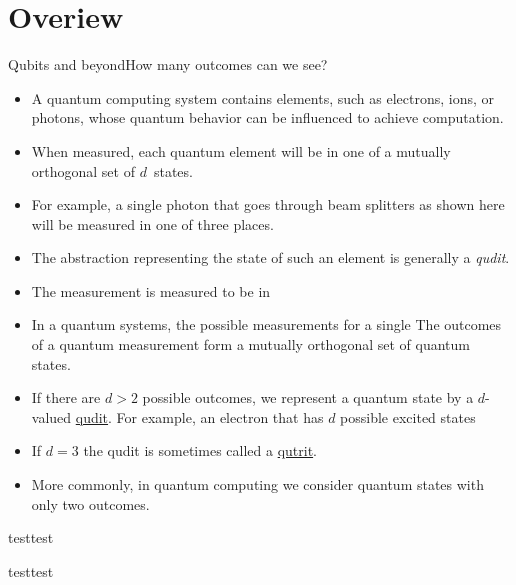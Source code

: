 
\section{Overiew}
\begin{frame}{Qubits and beyond}{How many outcomes can we see?}
\begin{itemize}
    \item A quantum computing system contains elements, such as electrons, ions, or photons, whose quantum behavior can be influenced to achieve computation.
    \item When measured, each quantum element will be in one of a mutually orthogonal set of $d$~states.
    \item For example, a single photon that goes through beam splitters as shown here will be measured in one of three places.
    \item The abstraction representing the state of such an element is generally a \emph{qudit}.
    \item The measurement is measured to be in 
    \item In a quantum systems, the possible measurements for a single The outcomes of a quantum measurement form a mutually orthogonal set of quantum states.
    \item If there are $d>2$ possible outcomes, we represent a quantum state by a $d$-valued 
    \href{https://en.wiktionary.org/wiki/qudit}{qudit}.  For example, an electron that has $d$ possible excited states 
    \item If $d=3$ the qudit is sometimes called
    a \href{https://en.wikipedia.org/wiki/Qutrit}{qutrit}.
    \item More commonly, in quantum computing we consider quantum states with only two outcomes.  
    
\end{itemize}
\end{frame}
\begin{frame}{test}{test}
\begin{TIKZP}
    \LightSource{}
\end{TIKZP}

\end{frame}
\begin{frame}{test}{test}
\begin{TIKZP}
    \BeamSplitter[rotate=-45]{}
\end{TIKZP}
    
\end{frame}
